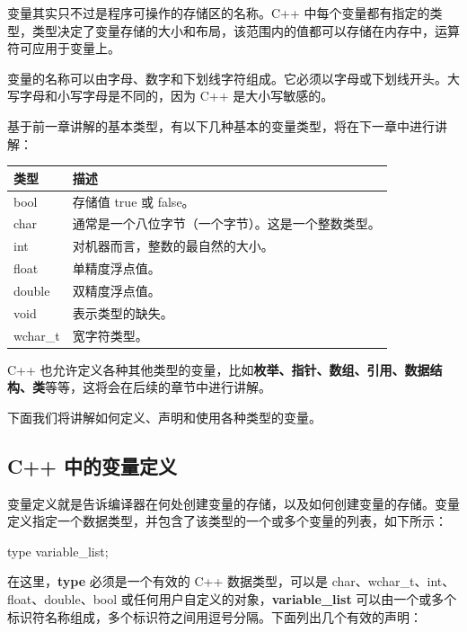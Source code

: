 \documentclass[
]{article}
\newenvironment{Shaded}{}{}
\newcommand{\NormalTok}[1]{#1}
\newcommand{\OperatorTok}[1]{\textcolor[rgb]{0.40,0.40,0.40}{#1}}
\begin{document}
变量其实只不过是程序可操作的存储区的名称。C++
中每个变量都有指定的类型，类型决定了变量存储的大小和布局，该范围内的值都可以存储在内存中，运算符可应用于变量上。

变量的名称可以由字母、数字和下划线字符组成。它必须以字母或下划线开头。大写字母和小写字母是不同的，因为
C++ 是大小写敏感的。

基于前一章讲解的基本类型，有以下几种基本的变量类型，将在下一章中进行讲解：

\begin{longtable}[]{@{}ll@{}}
\toprule
类型 & 描述 \\
\midrule
\endhead
bool & 存储值 true 或 false。 \\
char & 通常是一个八位字节（一个字节）。这是一个整数类型。 \\
int & 对机器而言，整数的最自然的大小。 \\
float & 单精度浮点值。 \\
double & 双精度浮点值。 \\
void & 表示类型的缺失。 \\
wchar\_t & 宽字符类型。 \\
\bottomrule
\end{longtable}

C++
也允许定义各种其他类型的变量，比如\textbf{枚举、指针、数组、引用、数据结构、类}等等，这将会在后续的章节中进行讲解。

下面我们将讲解如何定义、声明和使用各种类型的变量。

\hypertarget{c-ux4e2dux7684ux53d8ux91cfux5b9aux4e49}{%
\subsection{C++
中的变量定义}\label{c-ux4e2dux7684ux53d8ux91cfux5b9aux4e49}}

变量定义就是告诉编译器在何处创建变量的存储，以及如何创建变量的存储。变量定义指定一个数据类型，并包含了该类型的一个或多个变量的列表，如下所示：

\begin{Shaded}
\begin{Highlighting}[]
\NormalTok{type variable\_list}\OperatorTok{;}
\end{Highlighting}
\end{Shaded}

在这里，\textbf{type} 必须是一个有效的 C++ 数据类型，可以是
char、wchar\_t、int、float、double、bool
或任何用户自定义的对象，\textbf{variable\_list}
可以由一个或多个标识符名称组成，多个标识符之间用逗号分隔。下面列出几个有效的声明：
\end{document}
